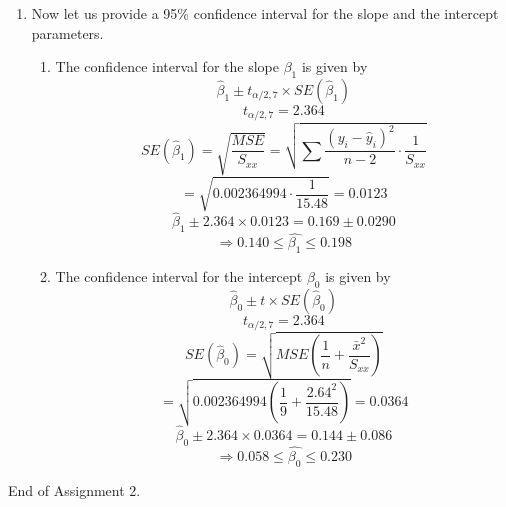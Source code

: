 \documentclass[12pt]{article}
\begin{document}
\begin{enumerate}[1.]
\begin{enumerate}
            \item Now let us provide a 95\% confidence interval for the slope and the intercept parameters.
            \begin{enumerate}
                \item The confidence interval for the slope $\beta_1$ is given by
                \[ \hat{\beta}_1 \pm t_{\alpha / 2, 7} \times SE(\hat{\beta}_1) \]
                \[ t_{\alpha / 2, 7} = 2.364 \]
                \[SE(\hat{\beta}_1) = \sqrt{\frac{MSE}{S_{xx}}} = \sqrt{\sum \frac{(y_i - \hat{y}_i)^2}{n-2} \cdot \frac{1}{S_{xx}}}\]
                \[ = \sqrt{0.002364994 \cdot \frac{1}{15.48}} = 0.0123\]
                \[ \hat{\beta}_1 \pm 2.364 \times 0.0123 = 0.169 \pm 0.0290 \]
                \[ \Rightarrow 0.140 \leq \hat{\beta_1} \leq 0.198 \]
                \item The confidence interval for the intercept $\beta_0$ is given by
                \[ \hat{\beta}_0 \pm t \times SE(\hat{\beta}_0) \]
                \[ t_{\alpha / 2, 7} = 2.364 \]
                \[ SE(\hat{\beta}_0) = \sqrt{MSE \left( \frac{1}{n} + \frac{\bar{x}^2}{S_{xx}} \right)} \]
                \[ = \sqrt{0.002364994 \left( \frac{1}{9} + \frac{2.64^2}{15.48} \right)} = 0.0364 \]
                \[ \hat{\beta}_0 \pm 2.364 \times 0.0364 = 0.144 \pm 0.086 \]
                \[ \Rightarrow 0.058 \leq \hat{\beta_0} \leq 0.230 \]
            \end{enumerate}
        \end{enumerate}
\end{enumerate}
End of Assignment 2.
\end{document}

